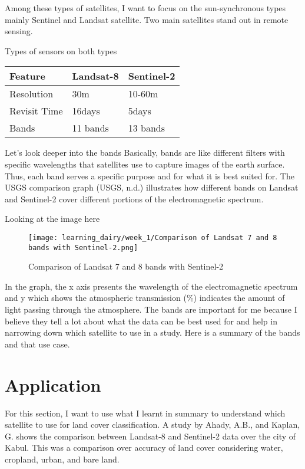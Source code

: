 \documentclass[
  letterpaper,
  DIV=11,
  numbers=noendperiod]{scrreprt}
\begin{document}
Among these types of satellites, I want to focus on the sun-synchronous
types mainly Sentinel and Landsat satellite. Two main satellites stand
out in remote sensing.

Types of sensors on both types

\begin{longtable}[]{@{}lll@{}}
\toprule\noalign{}
Feature & Landsat-8 & Sentinel-2 \\
\midrule\noalign{}
\endhead
\bottomrule\noalign{}
\endlastfoot
Resolution & 30m & 10-60m \\
Revisit Time & 16days & 5days \\
Bands & 11 bands & 13 bands \\
\end{longtable}

Let's look deeper into the bands Basically, bands are like different
filters with specific wavelengths that satellites use to capture images
of the earth surface. Thus, each band serves a specific purpose and for
what it is best suited for. The USGS comparison graph (USGS, n.d.)
illustrates how different bands on Landsat and Sentinel-2 cover
different portions of the electromagnetic spectrum.

Looking at the image here

\begin{figure}

{\centering \texttt{[image: learning\_dairy/week\_1/Comparison of Landsat 7 and 8 bands with Sentinel-2.png]}

}

\caption{Comparison of Landsat 7 and 8 bands with Sentinel-2}

\end{figure}

In the graph, the x axis presents the wavelength of the electromagnetic
spectrum and y which shows the atmospheric transmission (\%) indicates
the amount of light passing through the atmosphere. The bands are
important for me because I believe they tell a lot about what the data
can be best used for and help in narrowing down which satellite to use
in a study. Here is a summary of the bands and that use case.

\hypertarget{application}{%
\section{Application}\label{application}}

For this section, I want to use what I learnt in summary to understand
which satellite to use for land cover classification. A study by Ahady,
A.B., and Kaplan, G. shows the comparison between Landsat-8 and
Sentinel-2 data over the city of Kabul. This was a comparison over
accuracy of land cover considering water, cropland, urban, and bare
land.
\end{document}
